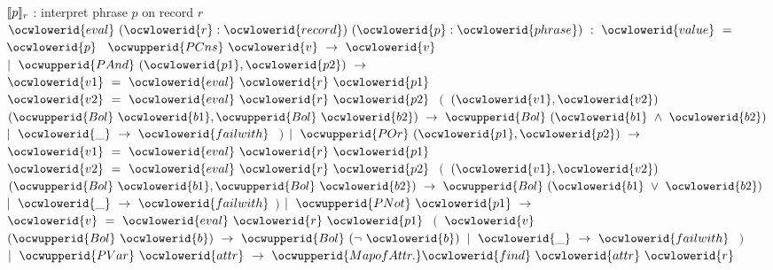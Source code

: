 \documentclass[12pt]{article}
\begin{document}
\ocwendcode{}\ocwindent{0.00em}
$\llbracket p\rrbracket_r$ : interpret phrase $p$ on record $r$ 
\ocweol
\label{rellens.ml:4432}%
\medskip
\ocwbegincode{}\ocwindent{0.00em}
~~$\ocwlowerid{eval}~(\ocwlowerid{r}:\ocwlowerid{record})~(\ocwlowerid{p}:\ocwlowerid{phrase})~:~\ocwlowerid{value}~=~$~$\ocwlowerid{p}~$\ocweol
\ocwindent{1.00em}
$\ocwupperid{PCns}~\ocwlowerid{v}~\rightarrow{}~\ocwlowerid{v}$\ocweol
\ocwindent{0.00em}
$\mid{}~\ocwupperid{PAnd}~(\ocwlowerid{p1},\ocwlowerid{p2})~\rightarrow{}$\ocweol
\ocwindent{2.00em}
~$\ocwlowerid{v1}~=~\ocwlowerid{eval}~\ocwlowerid{r}~\ocwlowerid{p1}~$\ocweol
\ocwindent{2.00em}
~$\ocwlowerid{v2}~=~\ocwlowerid{eval}~\ocwlowerid{r}~\ocwlowerid{p2}~$\ocweol
\ocwindent{2.00em}
$($~$(\ocwlowerid{v1},\ocwlowerid{v2})~$\ocweol
\ocwindent{3.00em}
$(\ocwupperid{Bol}~\ocwlowerid{b1},\ocwupperid{Bol}~\ocwlowerid{b2})~\rightarrow{}~\ocwupperid{Bol}~(\ocwlowerid{b1}~\land{}~\ocwlowerid{b2})$\ocweol
\ocwindent{2.00em}
$\mid{}~\ocwlowerid{\_}~\rightarrow{}~\ocwlowerid{failwith}~$\ocweol
\ocwindent{2.00em}
$)$\ocweol
\ocwindent{0.00em}
$\mid{}~\ocwupperid{POr}~(\ocwlowerid{p1},\ocwlowerid{p2})~\rightarrow{}$\ocweol
\ocwindent{2.00em}
~$\ocwlowerid{v1}~=~\ocwlowerid{eval}~\ocwlowerid{r}~\ocwlowerid{p1}~$\ocweol
\ocwindent{2.00em}
~$\ocwlowerid{v2}~=~\ocwlowerid{eval}~\ocwlowerid{r}~\ocwlowerid{p2}~$\ocweol
\ocwindent{2.00em}
$($~$(\ocwlowerid{v1},\ocwlowerid{v2})~$~\ocweol
\ocwindent{3.00em}
$(\ocwupperid{Bol}~\ocwlowerid{b1},\ocwupperid{Bol}~\ocwlowerid{b2})~\rightarrow{}~\ocwupperid{Bol}~(\ocwlowerid{b1}~\lor{}~\ocwlowerid{b2})~$\ocweol
\ocwindent{2.00em}
$\mid{}~\ocwlowerid{\_}~\rightarrow{}~\ocwlowerid{failwith}~$$)$\ocweol
\ocwindent{0.50em}
$\mid{}~\ocwupperid{PNot}~\ocwlowerid{p1}~\rightarrow{}$\ocweol
\ocwindent{2.00em}
~$\ocwlowerid{v}~=~\ocwlowerid{eval}~\ocwlowerid{r}~\ocwlowerid{p1}~$\ocweol
\ocwindent{2.00em}
$($~$\ocwlowerid{v}~$~\ocweol
\ocwindent{3.00em}
$(\ocwupperid{Bol}~\ocwlowerid{b})~\rightarrow{}~\ocwupperid{Bol}~(\lnot{}~\ocwlowerid{b})$\ocweol
\ocwindent{2.00em}
$\mid{}~\ocwlowerid{\_}~\rightarrow{}~\ocwlowerid{failwith}~$\ocweol
\ocwindent{2.00em}
$)$\ocweol
\ocwindent{0.50em}
$\mid{}~\ocwupperid{PVar}~\ocwlowerid{attr}~\rightarrow{}~\ocwupperid{MapofAttr.}\ocwlowerid{find}~\ocwlowerid{attr}~\ocwlowerid{r}$\ocweol
\end{document}
